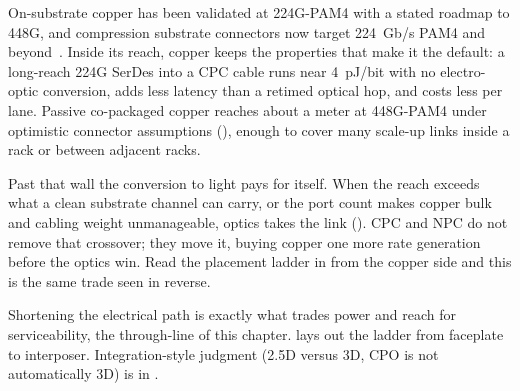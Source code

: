 On-substrate copper has been validated at 224G-PAM4 with a stated roadmap to 448G,
and compression substrate connectors now target 224~Gb/s PAM4 and
beyond~. Inside its reach, copper keeps the properties that make it the
default: a long-reach 224G SerDes into a CPC cable runs near 4~pJ/bit with no
electro-optic conversion, adds less latency than a retimed optical hop, and costs less
per lane. Passive co-packaged copper reaches about a meter at 448G-PAM4 under
optimistic connector assumptions (), enough to cover many scale-up
links inside a rack or between adjacent racks.

Past that wall the conversion to light pays for itself. When the reach exceeds what a
clean substrate channel can carry, or the port count makes copper bulk and cabling
weight unmanageable, optics takes the link (). CPC and NPC do not
remove that crossover; they move it, buying copper one more rate generation before the
optics win. Read the placement ladder in  from the copper side and
this is the same trade seen in reverse.

 Shortening the electrical path is exactly
what trades power and reach for serviceability, the through-line of this chapter.
 lays out the ladder from faceplate to interposer.
Integration-style judgment (2.5D versus 3D, CPO is not automatically 3D) is in
.

